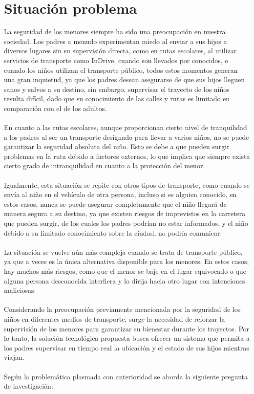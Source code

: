 \documentclass[12pt,onehalfspacing]{report}
\begin{document}
\section{Situación problema}
La seguridad de los menores siempre ha sido una preocupación en nuestra sociedad. Los padres a menudo experimentan miedo al enviar a sus hijos a diversos lugares sin su supervisión directa, como en rutas escolares, al utilizar servicios de transporte como InDrive, cuando son llevados por conocidos, o cuando los niños utilizan el transporte público, todos estos momentos generan una gran inquietud, ya que los padres desean asegurarse de que sus hijos lleguen sanos y salvos a su destino, sin embargo, supervisar el trayecto de los niños resulta difícil, dado que su conocimiento de las calles y rutas es limitado en comparación con el de los adultos.\\\\En cuanto a las rutas escolares, aunque proporcionan cierto nivel de tranquilidad a los padres al ser un transporte designado para llevar a varios niños, no se puede garantizar la seguridad absoluta del niño. Esto se debe a que pueden surgir problemas en la ruta debido a factores externos, lo que implica que siempre exista cierto grado de intranquilidad en cuanto a la protección del menor.\\\\Igualmente, esta situación se repite con otros tipos de transporte, como cuando se envía al niño en el vehículo de otra persona, incluso si es alguien conocido, en estos casos, nunca se puede asegurar completamente que el niño llegará de manera segura a su destino, ya que existen riesgos de imprevistos en la carretera que pueden surgir, de los cuales los padres podrían no estar informados, y el niño debido a su limitado conocimiento sobre la ciudad, no podría comunicar.\\\\La situación se vuelve aún más compleja cuando se trata de transporte público, ya que a veces es la única alternativa disponible para los menores. En estos casos, hay muchos más riesgos, como que el menor se baje en el lugar equivocado o que alguna persona desconocida interfiera y lo dirija hacia otro lugar con intenciones maliciosas.\\\\Considerando la preocupación previamente mencionada por la seguridad de los niños en diferentes medios de transporte, surge la necesidad de reforzar la supervisión de los menores para garantizar su bienestar durante los trayectos. Por lo tanto, la solución tecnológica propuesta busca ofrecer un sistema que permita a los padres supervisar en tiempo real la ubicación y el estado de sus hijos mientras viajan.\\\\Según la problemática plasmada con anterioridad se aborda la siguiente pregunta de investigación:\\
\end{document}
